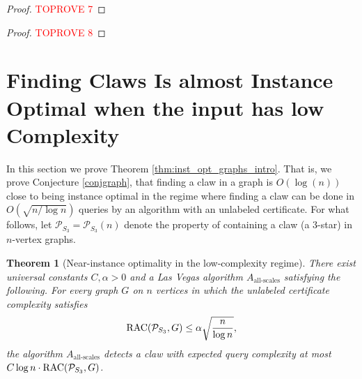 \documentclass[11pt]{article}
\numberwithin{equation}{section}
\newtheorem{theorem}{Theorem}[section]
\renewcommand{\P}{\mathcal{P}}
\newcommand{\1}{\mathbf{1}}
\newcommand{\remove}[1]{}
\begin{document}
\begin{proof}\textcolor{red}{TOPROVE 7}\end{proof}



\begin{proof}\textcolor{red}{TOPROVE 8}\end{proof}

\remove{
\section{The case of Claws}
For now we consider the case of permutations. 
\begin{theorem}

\end{theorem}

\newcommand{\lshort}{l_{\text{short}}}
\newcommand{\lmid}{l_{\text{mid}}}
\newcommand{\llong}{l_{\text{long}}}
\newcommand{\tmid}{t_{\text{mid}}}
\newcommand{\wlow}{w_{\text{low}}}
\newcommand{\whigh}{w_{\text{high}}}

\begin{proof}\textcolor{red}{TOPROVE 9}\end{proof}

\begin{proof}\textcolor{red}{TOPROVE 10}\end{proof}
} 
\section{Finding Claws Is almost Instance Optimal when the input has low Complexity} \label{sec:AlmostIO}


In this section we prove Theorem \ref{thm:inst_opt_graphs_intro}. That is, we prove Conjecture \ref{conjgraph}, that finding a claw in a graph is $O(\log(n))$ close to being instance optimal in the regime where finding a claw can be done in $O(\sqrt{n/\log n})$ queries by an algorithm with an unlabeled certificate. For what follows, let $\P_{S_3} = \P_{S_3}(n)$ denote the property of containing a claw (a $3$-star) in $n$-vertex graphs. 

\begin{theorem}[Near-instance optimality in the low-complexity regime] 
\label{thm:near_instance_optimality}
There exist universal constants $C, \alpha > 0$ and a Las Vegas algorithm $A_{\text{all-scales}}$ satisfying the following.
For every graph $G$ on $n$ vertices in which the unlabeled certificate complexity satisfies
$$\RACC(\P_{S_3}, G) \leq \alpha \sqrt{\frac{n}{\log n}},$$
the algorithm $A_{\text{all-scales}}$ detects a claw with expected query complexity at most $C \log n \cdot \RACC(\P_{S_3}, G)$.
\end{theorem}
\end{document}

